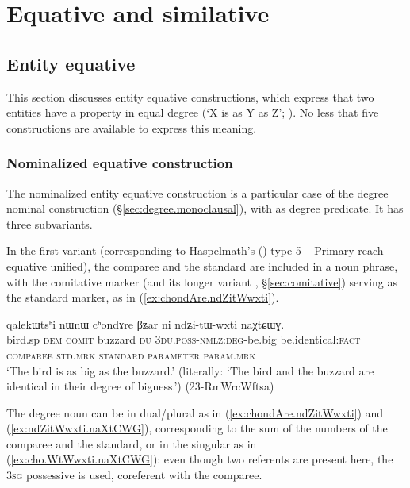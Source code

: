 \section{Equative and similative}


\subsection{Entity equative} \label{sec:equative}
This section discusses entity equative constructions, which express that two entities have a property in equal degree (`X is as Y as Z'; \citealt{haspelmath08equative}). No less that five constructions are available to express this meaning.

\subsubsection{Nominalized equative construction} \label{sec:nmlz.equative}
 
The nominalized entity equative construction is a particular case of the degree nominal construction (§\ref{sec:degree.monoclausal}), with  as degree predicate. It has three subvariants.

In the first variant (corresponding to Haspelmath's (\citeyear{haspelmath17equative}) type 5 -- Primary reach equative unified), the comparee and the standard are included in a noun phrase, with the comitative marker  (and its longer variant , §\ref{sec:comitative}) serving as the standard marker, as in (\ref{ex:chondAre.ndZitWwxti}).

\begin{exe}
\ex \label{ex:chondAre.ndZitWwxti}
\glll qalekɯtsʰi nɯnɯ cʰondɤre βʑar ni ndʑi-tɯ-wxti \phantom{espace}     naχtɕɯɣ.\\
bird.sp \textsc{dem} \textsc{comit} buzzard \textsc{du} \textsc{3du}.\textsc{poss}-\textsc{nmlz}:\textsc{deg}-be.big \phantom{espace} be.identical:\textsc{fact} \\
{\textsc{comparee}} { } \textsc{std}.\textsc{mrk} {\textsc{standard}} { } \textsc{parameter} \phantom{espace} \textsc{param}.\textsc{mrk} \\
\glt `The  bird is as big as the buzzard.' (literally: `The  bird and the buzzard are identical in their degree of bigness.')  (23-RmWrcWftsa)
\end{exe}

The degree noun can be in dual/plural as in (\ref{ex:chondAre.ndZitWwxti}) and (\ref{ex:ndZitWwxti.naXtCWG}), corresponding to the sum of the numbers of the comparee and the standard, or in the  singular as in (\ref{ex:cho.WtWwxti.naXtCWG}): even though two referents are present here, the \textsc{3sg} possessive  is used, coreferent with the comparee. 

